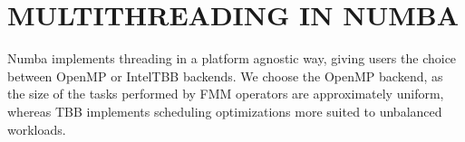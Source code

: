 \documentclass{IEEEcsmag}
\begin{document}


\section{MULTITHREADING IN NUMBA}

Numba implements threading in a platform agnostic way,  giving users the choice between OpenMP or IntelTBB backends. We choose the OpenMP backend, as the size of the tasks performed by FMM operators are approximately uniform, whereas TBB implements scheduling optimizations more suited to unbalanced workloads.
\end{document}

